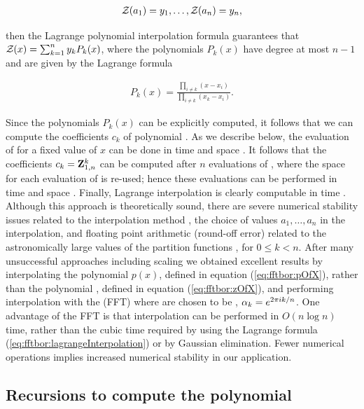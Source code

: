\begin{align}
\label{eq:fftbor:solutionsForAlpha}
\emZof{}{a_1} = y_1, \dots, \emZof{}{a_n} = y_n,
\end{align}

then the Lagrange polynomial interpolation formula guarantees that
${\mathcal Z}_{}(x) = \sum_{k=1}^n y_k P_k(x)$, where the polynomials $P_k(x)$ have degree
at most $n-1$ and are given by the Lagrange formula

\begin{align}
\label{eq:fftbor:lagrangeInterpolation}
P_k(x) = \frac{\prod_{i\ne k} (x-x_i)}{\prod_{i \ne k} (x_k-x_i)}.
\end{align}

Since the polynomials $P_k(x)$ can be explicitly computed, it follows that
we can compute the coefficients $c_k$ of polynomial \emZ{}. As we describe
below, the evaluation of \emZ{} for a fixed value of $x$ can be done in
time  and space .  It follows that the coefficients
$c_k={\bf Z}^{k}_{1,n}$ can be computed after
$n$ evaluations of \emZ{}, where the space for each evaluation of \emZ{}
is re-used; hence these evaluations can be performed in time  and space
. Finally,
Lagrange interpolation is clearly computable in time .
Although this approach is theoretically sound, there are severe
numerical stability issues related to the interpolation method
\cite{HighamBarycentricInterpolation},
the choice of values $a_1,\dots,a_{n}$ in the interpolation,
and floating point arithmetic (round-off error) related to the
astronomically large values of the partition functions
, for $0 \leq k < n$. After many unsuccessful
approaches including scaling we obtained excellent results by
interpolating the polynomial $p(x)$, defined in equation (\ref{eq:fftbor:pOfX}),
rather than the polynomial \emZ{}, defined in equation (\ref{eq:fftbor:zOfX}),
and performing interpolation with the \fft (FFT) \cite{cormen}
where \alphaN are
chosen to be \nRoUs,
$\alpha_k = e^{2 \pi i k/n}$.
One
advantage of the FFT is that interpolation can be performed in $O(n \log n)$
time, rather than the cubic time required by using the Lagrange formula
(\ref{eq:fftbor:lagrangeInterpolation}) or by Gaussian elimination. Fewer
numerical operations implies increased numerical stability in our application.

\subsection{Recursions to compute the polynomial
\texorpdfstring{}{}}
\label{subsec:fftbor:polynomial}

